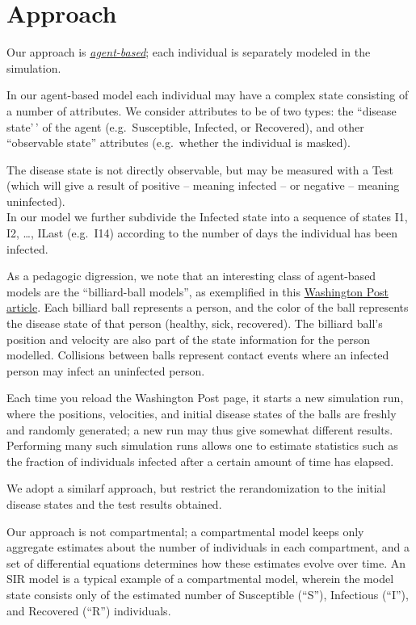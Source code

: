 \documentclass[11pt]{article}
\begin{document}
    
\newpage
    \hypertarget{approach}{%
\section{Approach}\label{approach}}

Our approach is
\href{https://en.wikipedia.org/wiki/Agent-based_model}{\emph{agent-based}};
each individual is separately modeled in the simulation.

In our agent-based model each individual may have a complex state
consisting of a number of attributes. We consider attributes to be of
two types: the ``disease state'\,' of the agent (e.g.~Susceptible,
Infected, or Recovered), and other ``observable state'' attributes
(e.g.~whether the individual is masked).

The disease state is not directly observable, but may be measured with a
Test (which will give a result of positive -- meaning infected -- or
negative -- meaning uninfected).\\
In our model we further subdivide the Infected state into a sequence of
states I1, I2, \ldots, ILast (e.g.~I14) according to the number of days
the individual has been infected.

As a pedagogic digression, we note that an interesting class of
agent-based models are the ``billiard-ball models'', as exemplified in
this
\href{https://www.washingtonpost.com/graphics/2020/world/corona-simulator/}{Washington
Post article}. Each billiard ball represents a person, and the color of
the ball represents the disease state of that person (healthy, sick,
recovered). The billiard ball's position and velocity are also part of
the state information for the person modelled. Collisions between balls
represent contact events where an infected person may infect an
uninfected person.

Each time you reload the Washington Post page, it starts a new
simulation run, where the positions, velocities, and initial disease
states of the balls are freshly and randomly generated; a new run may
thus give somewhat different results. Performing many such simulation
runs allows one to estimate statistics such as the fraction of
individuals infected after a certain amount of time has elapsed.

We adopt a similarf approach, but restrict the rerandomization to the
initial disease states and the test results obtained.

Our approach is not compartmental; a compartmental model keeps only
aggregate estimates about the number of individuals in each compartment,
and a set of differential equations determines how these estimates
evolve over time. An SIR model is a typical example of a compartmental
model, wherein the model state consists only of the estimated number of
Susceptible (``S''), Infectious (``I''), and Recovered (``R'')
individuals.
\end{document}
